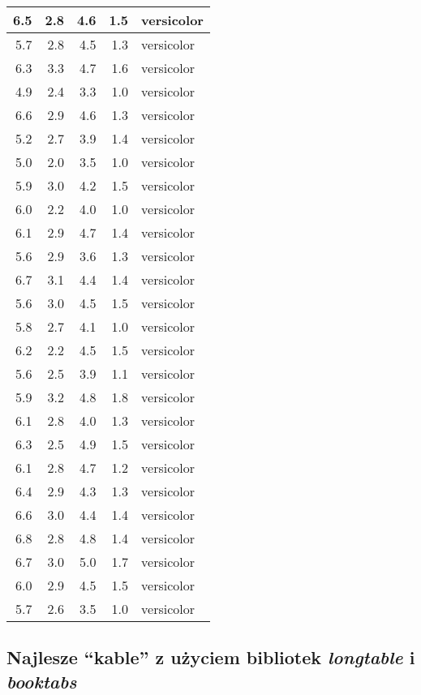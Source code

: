 \documentclass[a4paper, 10pt]{article}\usepackage[]{graphicx}\usepackage[]{color}
\begin{document}
\begin{longtable}{r|r|r|r|l}
\hline
6.5 & 2.8 & 4.6 & 1.5 & versicolor\\
\hline
5.7 & 2.8 & 4.5 & 1.3 & versicolor\\
\hline
6.3 & 3.3 & 4.7 & 1.6 & versicolor\\
\hline
4.9 & 2.4 & 3.3 & 1.0 & versicolor\\
\hline
6.6 & 2.9 & 4.6 & 1.3 & versicolor\\
\hline
5.2 & 2.7 & 3.9 & 1.4 & versicolor\\
\hline
5.0 & 2.0 & 3.5 & 1.0 & versicolor\\
\hline
5.9 & 3.0 & 4.2 & 1.5 & versicolor\\
\hline
6.0 & 2.2 & 4.0 & 1.0 & versicolor\\
\hline
6.1 & 2.9 & 4.7 & 1.4 & versicolor\\
\hline
5.6 & 2.9 & 3.6 & 1.3 & versicolor\\
\hline
6.7 & 3.1 & 4.4 & 1.4 & versicolor\\
\hline
5.6 & 3.0 & 4.5 & 1.5 & versicolor\\
\hline
5.8 & 2.7 & 4.1 & 1.0 & versicolor\\
\hline
6.2 & 2.2 & 4.5 & 1.5 & versicolor\\
\hline
5.6 & 2.5 & 3.9 & 1.1 & versicolor\\
\hline
5.9 & 3.2 & 4.8 & 1.8 & versicolor\\
\hline
6.1 & 2.8 & 4.0 & 1.3 & versicolor\\
\hline
6.3 & 2.5 & 4.9 & 1.5 & versicolor\\
\hline
6.1 & 2.8 & 4.7 & 1.2 & versicolor\\
\hline
6.4 & 2.9 & 4.3 & 1.3 & versicolor\\
\hline
6.6 & 3.0 & 4.4 & 1.4 & versicolor\\
\hline
6.8 & 2.8 & 4.8 & 1.4 & versicolor\\
\hline
6.7 & 3.0 & 5.0 & 1.7 & versicolor\\
\hline
6.0 & 2.9 & 4.5 & 1.5 & versicolor\\
\hline
5.7 & 2.6 & 3.5 & 1.0 & versicolor\\
\hline
\end{longtable}



\subsection{Najlesze ``kable'' z użyciem bibliotek \emph{longtable} i \emph{booktabs}}
\end{document}
